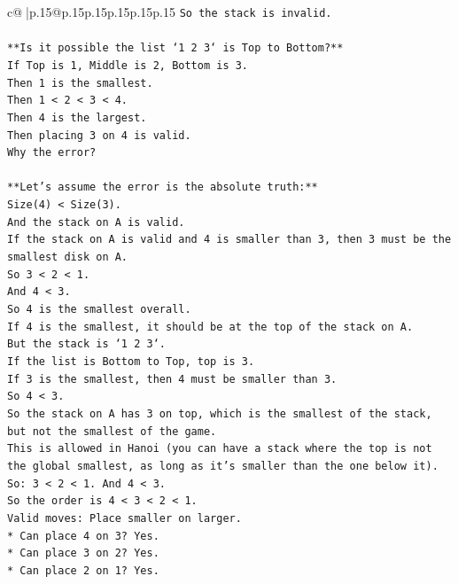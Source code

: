 \documentclass{article}
\begin{document}
{\begin{supertabular}{c@{$\;$}|p{.15\linewidth}@{}p{.15\linewidth}p{.15\linewidth}p{.15\linewidth}p{.15\linewidth}p{.15\linewidth}}
{{{\texttt{So the stack is invalid.} \\
\\ 
\texttt{**Is it possible the list `1 2 3` is Top to Bottom?**} \\
\texttt{If Top is 1, Middle is 2, Bottom is 3.} \\
\texttt{Then 1 is the smallest.} \\
\texttt{Then 1 < 2 < 3 < 4.} \\
\texttt{Then 4 is the largest.} \\
\texttt{Then placing 3 on 4 is valid.} \\
\texttt{Why the error?} \\
\\ 
\texttt{**Let's assume the error is the absolute truth:**} \\
\texttt{Size(4) < Size(3).} \\
\texttt{And the stack on A is valid.} \\
\texttt{If the stack on A is valid and 4 is smaller than 3, then 3 must be the smallest disk on A.} \\
\texttt{So 3 < 2 < 1.} \\
\texttt{And 4 < 3.} \\
\texttt{So 4 is the smallest overall.} \\
\texttt{If 4 is the smallest, it should be at the top of the stack on A.} \\
\texttt{But the stack is `1 2 3`.} \\
\texttt{If the list is Bottom to Top, top is 3.} \\
\texttt{If 3 is the smallest, then 4 must be smaller than 3.} \\
\texttt{So 4 < 3.} \\
\texttt{So the stack on A has 3 on top, which is the smallest of the stack, but not the smallest of the game.} \\
\texttt{This is allowed in Hanoi (you can have a stack where the top is not the global smallest, as long as it's smaller than the one below it).} \\
\texttt{So: 3 < 2 < 1. And 4 < 3.} \\
\texttt{So the order is 4 < 3 < 2 < 1.} \\
\texttt{Valid moves: Place smaller on larger.} \\
\texttt{*   Can place 4 on 3? Yes.} \\
\texttt{*   Can place 3 on 2? Yes.} \\
\texttt{*   Can place 2 on 1? Yes.} \\
}}}
\end{supertabular}}
\end{document}

